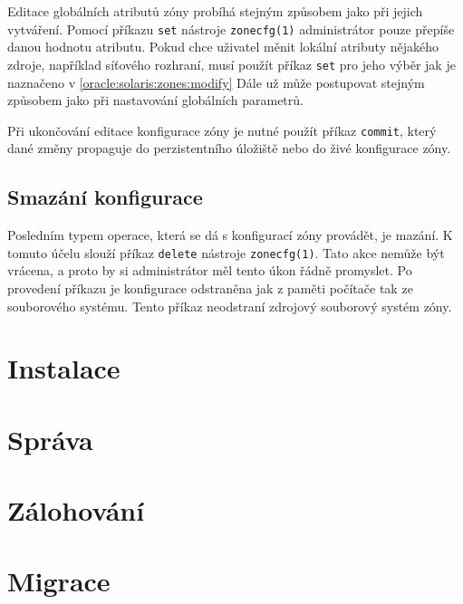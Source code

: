 Editace globálních atributů zóny probíhá stejným způsobem jako při jejich vytváření. Pomocí příkazu \verb|set| nástroje
\verb|zonecfg(1)| administrátor pouze přepíše danou hodnotu atributu. Pokud chce uživatel měnit lokální atributy nějakého zdroje,
například síťového rozhraní, musí použít příkaz \verb|set| pro jeho výběr jak je naznačeno v \ref{oracle:solaris:zones:modify}
Dále už může postupovat stejným způsobem jako při nastavování globálních parametrů.

Při ukončování editace konfigurace zóny je nutné použít příkaz \verb|commit|, který dané změny propaguje do perzistentního 
úložiště nebo do živé konfigurace zóny.
\subsection{Smazání konfigurace}
\label{chapter:zones:configuration:deleting}
Posledním typem operace, která se dá s konfigurací zóny provádět, je mazání. K tomuto účelu slouží příkaz \verb|delete| nástroje
\verb|zonecfg(1)|. Tato akce nemůže být vrácena, a proto by si administrátor měl tento úkon řádně promyslet. Po provedení
příkazu je konfigurace odstraněna jak z paměti počítače tak ze souborového systému. Tento příkaz neodstraní zdrojový souborový
systém zóny.
\section{Instalace}
\label{chapter:zones:instalation}
\section{Správa}
\label{chapter:zones:instalation}
\section{Zálohování}
\label{chapter:zones:backup}
\section{Migrace}
\label{chapter:zones:backup}